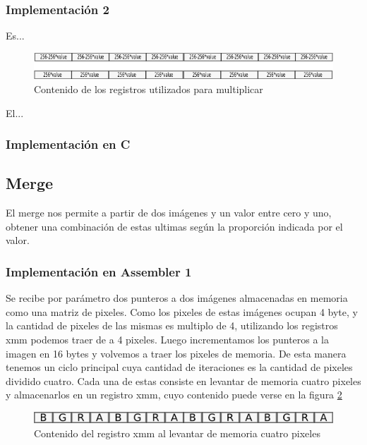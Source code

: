 \documentclass[a4paper]{article}
\begin{document}
\subsubsection{Implementación 2}

Es...

\begin{figure}[H]
\centering
\includegraphics[scale=0.8]{imagenes/256value.png}
\caption{Contenido de los registros utilizados para multiplicar}
\label{256value}
\end{figure}

El...



\subsubsection{Implementación en C}
%
%

\subsection{Merge}

El merge nos permite a partir de dos imágenes y un valor entre cero y uno, obtener una combinación de estas ultimas según la proporción indicada por el valor.

\subsubsection{Implementación en Assembler 1}

Se recibe por parámetro dos punteros a dos imágenes almacenadas en memoria como una matriz de pixeles. Como los pixeles de estas imágenes ocupan 4 byte, y la cantidad de pixeles de las mismas es multiplo de 4,  utilizando los registros xmm podemos traer de a 4 pixeles. Luego incrementamos los punteros a la imagen en 16 bytes y volvemos a traer los pixeles de memoria. De esta manera tenemos un ciclo principal cuya cantidad de iteraciones es la cantidad de pixeles dividido cuatro. Cada una de estas consiste en levantar de memoria cuatro pixeles y almacenarlos en un registro xmm, cuyo contenido puede verse en la figura \ref{primerXmm}

\begin{figure}[H]
\centering
\includegraphics[scale=0.8]{imagenes/primerXmm.png}
\caption{Contenido del registro xmm al levantar de memoria cuatro pixeles}
\label{primerXmm}
\end{figure}
\end{document}
